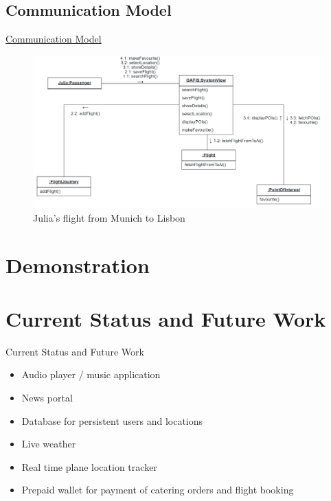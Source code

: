 \documentclass{beamer}
\begin{document}
\subsection{Communication Model}
\begin{frame}{\href{run:../images/ScenarioOneCommunication.png}{Communication Model}}
	\begin{figure}
		\includegraphics[width=.8\textwidth]{../images/ScenarioOneCommunication.png}
		\caption{Julia's flight from Munich to Lisbon}
	\end{figure}
\end{frame}
\section{Demonstration}
\section{Current Status and Future Work}
\begin{frame}{Current Status and Future Work}
	\begin{itemize}
		\item Audio player / music application
		\item News portal
		\item Database for persistent users and locations
		\item Live weather
		\item Real time plane location tracker
		\item Prepaid wallet for payment of catering orders and flight booking
	\end{itemize}
\end{frame}
\end{document}
